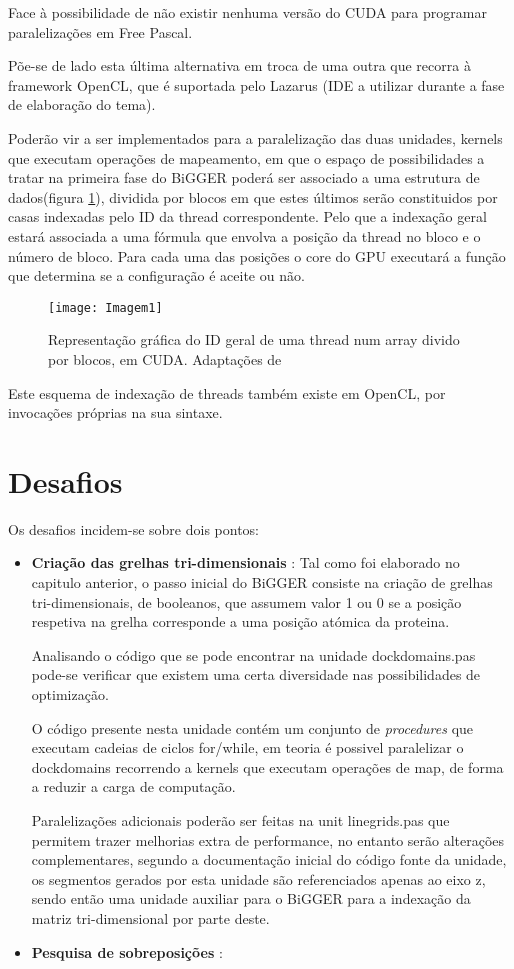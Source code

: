 Face à possibilidade de não existir nenhuma versão do CUDA para programar paralelizações em Free Pascal. %

 Põe-se de lado esta última alternativa em troca de uma outra que recorra à framework OpenCL, que é suportada pelo Lazarus (IDE a utilizar durante a fase de elaboração do tema).
 
Poderão vir a ser implementados para a paralelização das duas unidades, kernels que executam operações de mapeamento, em que o espaço de possibilidades a tratar na primeira fase do BiGGER poderá ser associado a uma estrutura de dados(figura \ref{fig:fig3subfig}), dividida por blocos em que estes últimos serão constituidos por casas indexadas pelo ID da thread correspondente. Pelo que a indexação geral estará associada a uma fórmula que envolva a posição da thread no bloco e o número de bloco. Para cada uma das posições o core do GPU executará a função que determina se a configuração é aceite ou não.

\begin{figure}[ht]
  \centering
    {\texttt{[image: Imagem1]}}
  \caption{Representação gráfica do ID geral de uma thread num array divido por blocos, em CUDA. Adaptações de \cite{Sainio2010CUDAEASYA} \cite{zeller2011cuda}}
  \label{fig:fig3subfig}
\end{figure}
Este esquema de indexação de threads também existe em OpenCL, por invocações próprias na sua sintaxe.

\section {Desafios}
\label{challenges}
Os desafios incidem-se sobre dois pontos:
\begin{itemize}
\item{\textbf{Criação das grelhas tri-dimensionais}} : 
Tal como foi elaborado no capitulo anterior, o passo inicial do BiGGER consiste na criação de grelhas tri-dimensionais, de booleanos, que assumem valor 1 ou 0 se a posição respetiva na grelha corresponde a uma posição atómica da proteina. 

Analisando o código que se pode encontrar na unidade dockdomains.pas pode-se verificar que existem uma certa diversidade nas possibilidades de optimização.  

O código presente nesta unidade contém um conjunto de \textit{procedures} que executam cadeias de ciclos for/while, em teoria é possivel paralelizar o dockdomains recorrendo a kernels que executam operações de map, de forma a reduzir a carga de computação.

Paralelizações adicionais poderão ser feitas na unit linegrids.pas que permitem trazer melhorias extra de performance, no entanto serão alterações complementares, segundo a documentação inicial do código fonte da unidade, os segmentos gerados por esta unidade são referenciados apenas ao eixo z, sendo então uma unidade auxiliar para o BiGGER para a indexação da matriz tri-dimensional por parte deste.

\item{\textbf{Pesquisa de sobreposições}} : 
\end{itemize}
